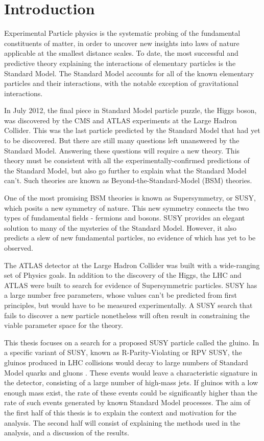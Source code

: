 \chapter{Introduction} \label{ch:intro}

Experimental Particle physics is the systematic probing of the fundamental constituents of matter,
in order to uncover new insights into laws of nature applicable at the smallest distance scales.
To date, the most successful and predictive theory explaining the interactions of elementary particles is the Standard Model.
The Standard Model accounts for all of the known elementary particles and their interactions, with the notable exception of gravitational interactions.

In July 2012, the final piece in Standard Model particle puzzle, the Higgs boson, was discovered by the CMS and ATLAS experiments at the
Large Hadron Collider.
This was the last particle predicted by the Standard Model that had yet to be discovered.
But there are still many questions left unanswered by the Standard Model.
Answering these questions will require a new theory.
This theory must be consistent with all the experimentally-confirmed predictions of the Standard Model,
but also go further to explain what the Standard Model can't.
Such theories are known as Beyond-the-Standard-Model (BSM) theories.

One of the most promising BSM theories is known as Supersymmetry, or SUSY, which posits a new symmetry of nature.
This new symmetry connects the two types of fundamental fields - fermions and bosons.
SUSY provides an elegant solution to many of the mysteries of the Standard Model.
However, it also predicts a slew of new fundamental particles, no evidence of which has yet to be observed.

The ATLAS detector at the Large Hadron Collider was built with a wide-ranging set of Physics goals.
In addition to the discovery of the Higgs, the LHC and ATLAS were built to search for evidence of Supersymmetric particles.
SUSY has a large number free parameters, whose values can't be predicted from first principles, but would have to be measured experimentally.
A SUSY search that fails to discover a new particle nonetheless will often result in constraining the viable parameter space for the theory.

This thesis focuses on a search for a proposed SUSY particle called the gluino.
In a specific variant of SUSY, known as R-Parity-Violating or RPV SUSY, the gluinos produced in LHC collisions would
decay to large numbers of Standard Model quarks and gluons .
These events would leave a characteristic signature in the detector, consisting of a large number of high-mass jets.
If gluinos with a low enough mass exist, the rate of these events could be significantly higher than the rate of such events
generated by known Standard Model processes.
The aim of the first half of this thesis is to explain the context and motivation for the analysis.
The second half will consist of explaining the methods used in the analysis, and a discussion of the results.

